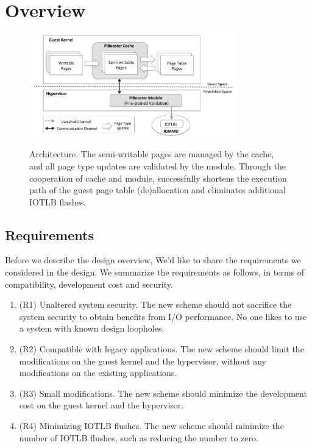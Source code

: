 \section{\name Overview} \label{sec:overview}
\begin{figure}[ht]
\centering
\includegraphics[width=0.8\textwidth]{image/overview/arch.pdf} \\
\caption{\name Architecture. The semi-writable pages are managed by the \name cache, and all page type updates are validated by the \name module.
Through the cooperation of \name cache and \name module, \name successfully shortens the execution path of the guest page table (de)allocation and eliminates additional IOTLB flashes.}
\label{fig:overview}
\end{figure}

\subsection{Requirements}\label{sec:req}
Before we describe the design overview, We'd like to share the requirements we considered in the design.
We summarize the requirements as follows, in terms of compatibility, development cost and security.
\begin{enumerate}
\item (R1) Unaltered system security. The new scheme should not sacrifice the system security to obtain benefits from I/O performance. No one likes to use a system with known design loopholes.
\item (R2) Compatible with legacy applications. The new scheme should limit the modifications on the guest kernel and the hypervisor, without any modifications on the existing applications.
\item (R3) Small modifications. The new scheme should minimize the development cost on the guest kernel and the hypervisor.
\item (R4) Minimizing IOTLB flushes. The new scheme should minimize the number of IOTLB flushes, such as reducing the number to zero.
\end{enumerate}


